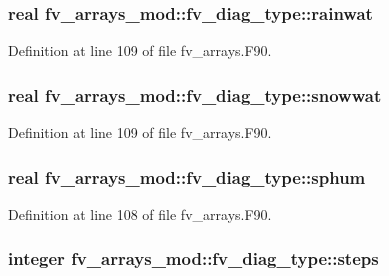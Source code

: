 \subsubsection[{rainwat}]{\setlength{\rightskip}{0pt plus 5cm}real fv\-\_\-arrays\-\_\-mod\-::fv\-\_\-diag\-\_\-type\-::rainwat}\label{structfv__arrays__mod_1_1fv__diag__type_a3cc3219727d54802eb98783a7f1bd2a9}


Definition at line 109 of file fv\-\_\-arrays.\-F90.

\subsubsection[{snowwat}]{\setlength{\rightskip}{0pt plus 5cm}real fv\-\_\-arrays\-\_\-mod\-::fv\-\_\-diag\-\_\-type\-::snowwat}\label{structfv__arrays__mod_1_1fv__diag__type_af4f8361914400d6e1c225b9dea392d52}


Definition at line 109 of file fv\-\_\-arrays.\-F90.

\subsubsection[{sphum}]{\setlength{\rightskip}{0pt plus 5cm}real fv\-\_\-arrays\-\_\-mod\-::fv\-\_\-diag\-\_\-type\-::sphum}\label{structfv__arrays__mod_1_1fv__diag__type_ab7170e3cf0bddbc87fe82585a9062b27}


Definition at line 108 of file fv\-\_\-arrays.\-F90.

\subsubsection[{steps}]{\setlength{\rightskip}{0pt plus 5cm}integer fv\-\_\-arrays\-\_\-mod\-::fv\-\_\-diag\-\_\-type\-::steps}\label{structfv__arrays__mod_1_1fv__diag__type_a2dfa52c702f772c7ce4d8935a9b237df}


